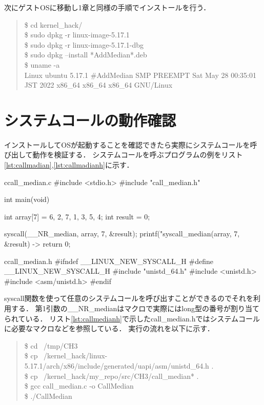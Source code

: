 次にゲストOSに移動し1章と同様の手順でインストールを行う．
\begin{quote}
\$ cd kernel\_hack/ \\
\$ sudo dpkg -r linux-image-5.17.1 \\
\$ sudo dpkg -r linux-image-5.17.1-dbg \\
\$ sudo dpkg --install *AddMedian*.deb \\
\$ uname -a \\
Linux ubuntu 5.17.1 \#AddMedian SMP PREEMPT Sat May 28 00:35:01 JST 2022 x86\_64 x86\_64 x86\_64 GNU/Linux
\end{quote}

\section{システムコールの動作確認}
インストールしてOSが起動することを確認できたら実際にシステムコールを呼び出して動作を検証する．
システムコールを呼ぶプログラムの例をリスト\ref{lst:callmadian},\ref{lst:callmadianh}に示す．
\begin{longlisting}
\begin{myminted}{c}{call\_median.c}
#include <stdio.h>
#include "call_median.h"

int main(void) {
    int array[7] = {6, 2, 7, 1, 3, 5, 4};
    int result = 0;

    syscall(__NR_median, array, 7, &result);
    printf("syscall_median(array, 7, &result) -> %
    return 0;
}
\end{myminted}
\caption{medianを呼ぶプログラム}
\label{lst:callmedian}
\end{longlisting}

\begin{longlisting}
\begin{myminted}{c}{call\_median.h}
#ifndef __LINUX_NEW_SYSCALL_H
#define __LINUX_NEW_SYSCALL_H
#include "unistd_64.h"
#include <unistd.h>
#include <asm/unistd.h>
#endif
\end{myminted}
\caption{call\_median.h}
\label{lst:callmedianh}
\end{longlisting}

syscall関数を使って任意のシステムコールを呼び出すことができるのでそれを利用する．
第1引数の\_\_NR\_medianはマクロで実際にはlong型の番号が割り当てられている．\cite{unistd32}
リスト\ref{lst:callmedianh}で示したcall\_median.hではシステムコールに必要なマクロなどを参照している．
実行の流れを以下に示す．

\begin{quote}
\$ cd ~/tmp/CH3 \\
\$ cp ~/kernel\_hack/linux-5.17.1/arch/x86/include/generated/uapi/asm/unistd\_64.h . \\
\$ cp ~/kernel\_hack/my\_repo/src/CH3/call\_median* . \\
\$ gcc call\_median.c -o CallMedian \\
\$ ./CallMedian
\end{quote}

